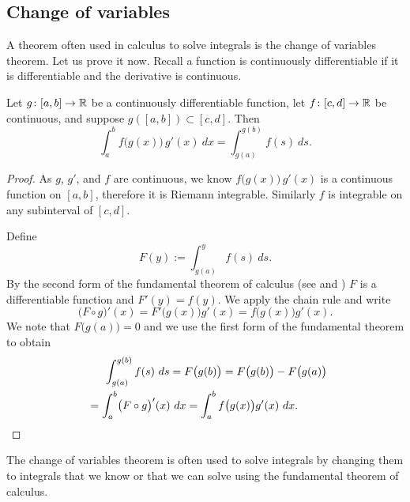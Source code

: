 \subsection{Change of variables}

A theorem often used in calculus to solve integrals is the change of
variables theorem.  Let us prove it now.  Recall 
a function is continuously differentiable if
it is differentiable and the derivative is continuous.

\begin{thm}
Let $g \colon [a,b] \to {\mathbb{R}}$ be a continuously differentiable function,
let $f \colon [c,d] \to {\mathbb{R}}$ be continuous, and suppose
$g([a,b]) \subset [c,d]$.  Then
\begin{equation*}
\int_a^b f\bigl(g(x)\bigr)\, g'(x)~ dx =
\int_{g(a)}^{g(b)} f(s)~ ds .
\end{equation*}
\end{thm}

\begin{proof}
As $g$, $g'$, and $f$ are continuous, we know $f\bigl(g(x)\bigr)\,g'(x)$
is a continuous function on $[a,b]$, therefore it is Riemann integrable.
Similarly $f$ is integrable on any subinterval of $[c,d]$.

Define 
\begin{equation*}
F(y) := \int_{g(a)}^{y} f(s)~ds .
\end{equation*}
By the second form of the fundamental
theorem of calculus (see  and )
$F$ is a differentiable function and $F'(y) = f(y)$.  We apply the chain
rule and write
\begin{equation*}
\bigl( F \circ g \bigr)' (x) =
F'\bigl(g(x)\bigr) g'(x)
=
f\bigl(g(x)\bigr) g'(x) .
\end{equation*}
We note that $F\bigl(g(a)\bigr) = 0$ and we
use the first form of the fundamental theorem
to obtain
\begin{multline*}
\qquad %
\int_{g(a)}^{g(b)} f(s)~ds = F\bigl(g(b)\bigr) = F\bigl(g(b)\bigr)-F\bigl(g(a)\bigr)
\\
=
\int_a^b 
\bigl( F \circ g \bigr)' (x) ~dx
=
\int_a^b 
f\bigl(g(x)\bigr) g'(x)
~dx .
\qquad %
\qedhere
\end{multline*}
\end{proof}

The change of variables theorem is often used to solve integrals by changing them
to integrals that we know or that we can solve using the fundamental theorem of
calculus.

